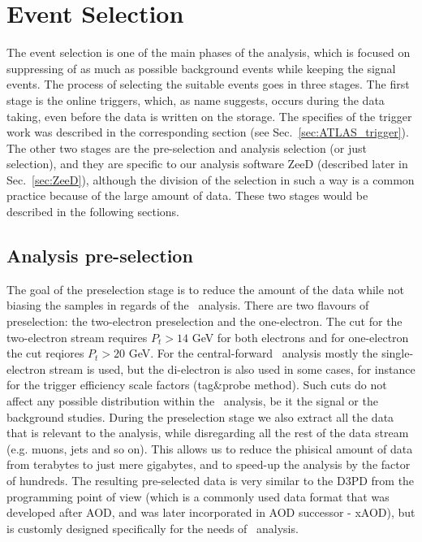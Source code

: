 \chapter{Event Selection}
\label{sec:Selection}

The event selection is one of the main phases of the analysis, which is focused on suppressing of as much as possible background events while keeping the signal events. The process of selecting the suitable events goes in three stages. The first stage is the online triggers, which, as name suggests, occurs during the data taking, even before the data is written on the storage. The specifies of the trigger work was described in the corresponding section (see Sec.~\ref{sec:ATLAS_trigger}). The other two stages are the pre-selection and analysis selection (or just selection), and they are specific to our analysis software ZeeD (described later in Sec.~\ref{sec:ZeeD}), although the division of the selection in such a way is a common practice because of the large amount of data. These two stages would be described in the following sections.

\section{Analysis pre-selection}
\label{sec:Sel_pre-sel}

The goal of the preselection stage is to reduce the amount of the data while not biasing the samples in regards of the \Zee\ analysis. There are two flavours of preselection: the two-electron preselection and the one-electron. The cut for the two-electron stream requires $P_{t} > 14$ GeV for both electrons and for one-electron the cut reqiores $P_{t} > 20$ GeV. For the central-forward \Zee\ analysis mostly the single-electron stream is used, but the di-electron is also used in some cases, for instance for the trigger efficiency scale factors (tag\&probe method). Such cuts do not affect any possible distribution within the \Zee\ analysis, be it the signal or the background studies. During the preselection stage we also extract all the data that is relevant to the analysis, while disregarding all the rest of the data stream (e.g. muons, jets and so on). This allows us to reduce the phisical amount of data from terabytes to just mere gigabytes, and to speed-up the analysis by the factor of hundreds. The resulting pre-selected data is very similar to the D3PD from the programming point of view (which is a commonly used data format that was developed after AOD, and was later incorporated in AOD successor - xAOD), but is customly designed specifically for the needs of \Zee\ analysis.

